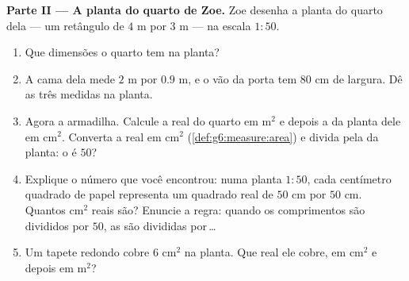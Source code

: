 \begin{problem}
\medskip
\noindent\textbf{Parte II --- A planta do quarto de Zoe.}
Zoe desenha a planta do quarto dela --- um retângulo de $4$ m por
$3$ m --- na escala $1:50$.
\begin{enumerate}[resume]
  \item Que dimensões o quarto tem na planta?
  \item A cama dela mede $2$ m por $0.9$ m, e o vão da porta tem
        $80$ cm de largura. Dê as três medidas na planta.
  \item Agora a armadilha. Calcule a  real do quarto em m$^2$ e
        depois a  da planta dele em cm$^2$. Converta a  real em
        cm$^2$ (\cref{def:g6:measure:area}) e divida pela  da
        planta: o  é $50$?
  \item Explique o número que você encontrou: numa planta $1:50$, cada
        centímetro quadrado de papel representa um quadrado real de
        $50$ cm por $50$ cm. Quantos cm$^2$ reais são? Enuncie a regra:
        quando os comprimentos são divididos por $50$, as  são
        divididas por\,\dots
  \item Um tapete redondo cobre $6$ cm$^2$ na planta. Que  real ele
        cobre, em cm$^2$ e depois em m$^2$?
\end{enumerate}


\end{problem}
